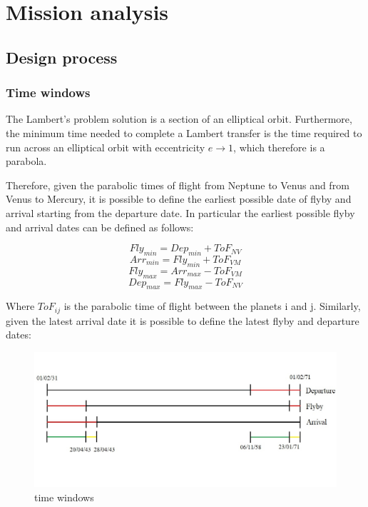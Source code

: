 \documentclass[11pt,a4paper]{report}
\begin{document}
\chapter{Mission analysis}

\section{Design process}
\subsection{Time windows}
The Lambert’s problem solution is a section of an elliptical orbit. Furthermore, the minimum time needed to complete a Lambert transfer is the time required to run across an elliptical orbit with eccentricity $e\rightarrow1$, which therefore is a parabola.

Therefore, given the parabolic times of flight from Neptune to Venus and from Venus to Mercury, it is possible to define the earliest possible date of flyby and arrival starting from the departure date. In particular the earliest possible flyby  and arrival dates can be defined as follows:

\begin{equation*}
    Fly_{min}=Dep_{min}+ ToF_{NV}
\end{equation*}
\begin{equation*}
    Arr_{min}=Fly_{min} + ToF_{VM}
\end{equation*}
\begin{equation*}
    Fly_{max}=Arr_{max}- ToF_{VM}
\end{equation*}
\begin{equation*}
    Dep_{max}=Fly_{max} - ToF_{NV}
\end{equation*}

Where $ToF_{ij}$ is the parabolic time of flight between the planets i and j.
Similarly, given the latest arrival date it is possible to define the latest flyby and departure dates:

\begin{figure}[H]
\centering
\includegraphics[width = \textwidth]{time_windows.jpg}
\caption{time windows}
\end{figure}
\end{document}
